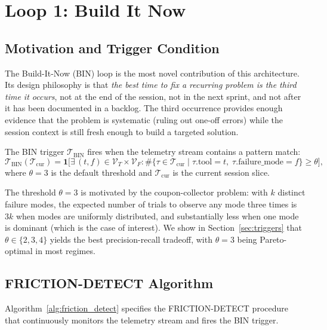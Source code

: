 \section{Loop 1: Build It Now}

\label{sec:loop1}

\subsection{Motivation and Trigger Condition}

The Build-It-Now (BIN) loop is the most novel contribution of this architecture.
Its design philosophy is that \emph{the best time to fix a recurring problem
is the third time it occurs}, not at the end of the session, not in the next
sprint, and not after it has been documented in a backlog. The third occurrence
provides enough evidence that the problem is systematic (ruling out one-off
errors) while the session context is still fresh enough to build a targeted
solution.

\begin{definition}
\label{def:bin_trigger}
The BIN trigger $\mathcal{T}_{\text{BIN}}$ fires when the telemetry stream
contains a pattern match:
\begin{equation}
\mathcal{T}_{\text{BIN}}(\mathcal{T}_{\text{cur}}) = \mathbf{1}\bigl[
    \exists\, (t, f) \in \mathcal{V}_T \times \mathcal{V}_F :
    \#\{ \tau \in \mathcal{T}_{\text{cur}} \mid \tau.\text{tool}=t,\;
    \tau.\text{failure\_mode}=f \} \geq \theta
\bigr],
\end{equation}
where $\theta = 3$ is the default threshold and $\mathcal{T}_{\text{cur}}$
is the current session slice.
\end{definition}

The threshold $\theta = 3$ is motivated by the coupon-collector problem: with
$k$ distinct failure modes, the expected number of trials to observe any mode
three times is $3k$ when modes are uniformly distributed, and substantially
less when one mode is dominant (which is the case of interest). We show in
Section~\ref{sec:triggers} that $\theta \in \{2,3,4\}$ yields the best
precision-recall tradeoff, with $\theta = 3$ being Pareto-optimal in most
regimes.

\subsection{FRICTION-DETECT Algorithm}

Algorithm~\ref{alg:friction_detect} specifies the FRICTION-DETECT procedure
that continuously monitors the telemetry stream and fires the BIN trigger.

